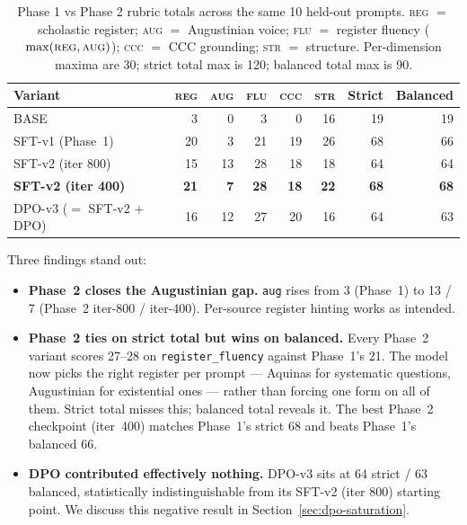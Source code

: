 \begin{table}[H]
\centering
\caption{Phase 1 vs Phase 2 rubric totals across the same 10 held-out
prompts. \textsc{reg} $=$ scholastic register; \textsc{aug} $=$
Augustinian voice; \textsc{flu} $=$ register fluency
($\max(\textsc{reg}, \textsc{aug})$); \textsc{ccc} $=$ CCC grounding;
\textsc{str} $=$ structure. Per-dimension maxima are 30; strict
total max is 120; balanced total max is 90.}
\label{tab:rubric_phase2}
\small
\setlength{\tabcolsep}{5pt}
\renewcommand{\arraystretch}{1.2}
\begin{tabular}{l r r r r r r r}
\toprule
\textbf{Variant} & \textsc{reg} & \textsc{aug} & \textsc{flu} & \textsc{ccc} & \textsc{str} & \textbf{Strict} & \textbf{Balanced} \\
\midrule
BASE                       &  3 &  0 &  3 &  0 & 16 & 19 & 19 \\
SFT-v1 (Phase~1)           & 20 &  3 & 21 & 19 & 26 & 68 & 66 \\
SFT-v2 (iter 800)          & 15 & 13 & 28 & 18 & 18 & 64 & 64 \\
\textbf{SFT-v2 (iter 400)} & \textbf{21} & \textbf{7} & \textbf{28} & \textbf{18} & \textbf{22} & \textbf{68} & \textbf{68} \\
DPO-v3 ($=$ SFT-v2 $+$ DPO) & 16 & 12 & 27 & 20 & 16 & 64 & 63 \\
\bottomrule
\end{tabular}
\end{table}

Three findings stand out:

\begin{itemize}
  \item \textbf{Phase~2 closes the Augustinian gap.}
        \texttt{aug} rises from 3 (Phase~1) to 13 / 7 (Phase~2
        iter-800 / iter-400). Per-source register hinting works as
        intended.
  \item \textbf{Phase~2 ties on strict total but wins on balanced.}
        Every Phase~2 variant scores 27--28 on
        \texttt{register\_fluency} against Phase~1's 21. The model now
        picks the right register per prompt --- Aquinas for systematic
        questions, Augustinian for existential ones --- rather than
        forcing one form on all of them. Strict total misses this;
        balanced total reveals it. The best Phase~2 checkpoint
        (iter~400) matches Phase~1's strict 68 and beats Phase~1's
        balanced 66.
  \item \textbf{DPO contributed effectively nothing.} DPO-v3 sits at
        64 strict / 63 balanced, statistically indistinguishable from
        its SFT-v2 (iter 800) starting point. We discuss this negative
        result in Section~\ref{sec:dpo-saturation}.
\end{itemize}
